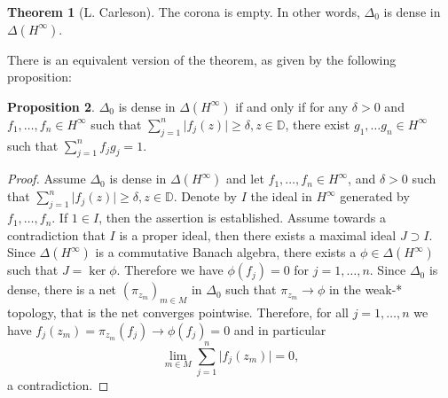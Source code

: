 \documentclass[letterpaper, 11pt]{article}
\newcommand{\D}{\mathbb{D}}
\newcommand{\1}{\mathds{1}}
\theoremstyle{definition}
\newtheorem{theorem}{Theorem}
\newtheorem{proposition}[theorem]{Proposition}
\begin{document}
\begin{theorem}[L. Carleson] \label{thm:corona}
  The corona is empty. In other words, $\Delta_0$ is dense in $\Delta(H^\infty)$.
\end{theorem}

There is an equivalent version of the theorem, as given by the following proposition:

\begin{proposition} \label{prop:corona-equiv}
  $\Delta_0$ is dense in $\Delta(H^\infty)$ if and only if for any $\delta > 0$ and $f_1, \dots, f_n \in H^\infty$ such that $\sum_{j=1}^n \vert f_j(z) \vert \geq \delta, z \in \D$, there exist $g_1, \dots g_n \in H^\infty$ such that $\sum_{j=1}^n f_j g_j = 1$.
\end{proposition}

\begin{proof}
  Assume $\Delta_0$ is dense in $\Delta(H^\infty)$ and let $f_1, \dots, f_n \in H^\infty$, and $\delta > 0$ such that $\sum_{j=1}^n \vert f_j(z) \vert \geq \delta, z \in \D$. Denote by $I$ the ideal in $H^\infty$ generated by $f_1, \dots, f_n$. If $1 \in I$, then the assertion is established. Assume towards a contradiction that $I$ is a proper ideal, then there exists a maximal ideal $J \supset I$. Since $\Delta(H^\infty)$ is a commutative Banach algebra, there exists a $\phi \in \Delta(H^\infty)$ such that $J = \ker \phi$. Therefore we have $\phi(f_j) = 0$ for $j=1,\dots,n$. Since $\Delta_0$ is dense, there is a net $(\pi_{z_m})_{m \in M}$ in $\Delta_0$ such that $\pi_{z_m} \to \phi$ in the weak\nobreakdash-* topology, that is the net converges pointwise. Therefore, for all $j=1,\dots,n$ we have $f_j(z_m) = \pi_{z_m}(f_j) \to \phi(f_j) = 0$ and in particular
  $$ \lim_{m \in M} \sum_{j=1}^n \vert f_j(z_m) \vert = 0, $$
  a contradiction.


\end{proof}
\end{document}
